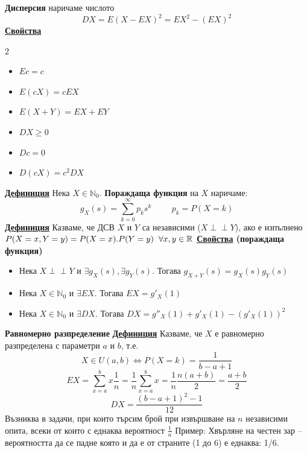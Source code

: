 \documentclass{article}
\begin{document}
\textbf{Дисперсия} наричаме числото $$DX = E(X - EX)^2 = EX^2 - (EX)^2$$
\textbf{\underline{Свойства}}
\begin{multicols}{2}
    \begin{itemize}
        \item $Ec = c$
        \item $E(cX) = cEX$
        \item $E(X + Y) = EX + EY$
        \item $DX \ge 0$
        \item $Dc = 0$
        \item $D(cX) = c^2DX$
    \end{itemize}
\end{multicols}
\textbf{\underline{Дефиниция}}
Нека $X \in \mathbb{N}_0$. \textbf{Пораждаща функция} на $X$ наричаме:
$$g_X(s) = \sum_{k=0}^{\infty}p_ks^k \hspace{1cm} p_k = P(X = k)$$
\textbf{\underline{Дефиниция}}
Казваме, че ДСВ $X$ и $Y$ са независими ($X \perp\!\!\!\perp Y$), ако е изпълнено $P(X = x, Y = y) = P(X = x) . P(Y = y) \hspace{0.2cm} \forall x, y \in \mathbb{R}$ \newline\newline
\textbf{\underline{Свойства} (пораждаща функция)}
\begin{itemize}
    \item Нека $X \perp\!\!\!\perp Y$ и $\exists g_X(s), \exists g_Y(s)$. Тогава $g_{X+Y}(s) = g_X(s)g_Y(s)$
    \item Нека $X \in \mathbb{N}_0$ и $\exists EX$. Тогава $EX = g'_X(1)$
    \item Нека $X \in \mathbb{N}_0$ и $\exists DX$. Тогава $DX = g''_X(1) + g'_X(1) - (g'_X(1))^2$
\end{itemize}
\textbf{Равномерно разпределение} \newline\newline
\textbf{\underline{Дефиниция}}
Казваме, че $X$ е равномерно разпределена с параметри $a$ и $b$, т.е. $$X \in U(a, b) \iff P(X = k) = \frac{1}{b - a + 1}$$
$$EX = \sum_{x=a}^{b} x \frac{1}{n} = \frac{1}{n} \sum_{x=a}^{b} x = \frac{1}{n} \frac{n(a + b)}{2} = \frac{a + b}{2}$$
$$DX = \frac{(b - a + 1)^2 - 1}{12}$$
Възниква в задачи, при които търсим брой при извършване на $n$ независими опита, всеки от които с еднаква вероятност $\frac{1}{n}$ \newline\newline
Пример: Хвърляне на честен зар – вероятността да се падне която и да е от страните (1 до 6) е еднаква: 1/6. \newline\newline
\end{document}
